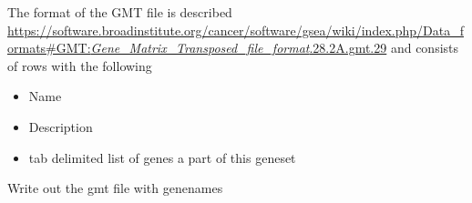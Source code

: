 \documentclass[
]{book}
\newenvironment{Shaded}{\begin{snugshade}}{\end{snugshade}}
\newcommand{\AttributeTok}[1]{\textcolor[rgb]{0.13,0.29,0.53}{#1}}
\newcommand{\ControlFlowTok}[1]{\textcolor[rgb]{0.13,0.29,0.53}{\textbf{#1}}}
\newcommand{\FunctionTok}[1]{\textcolor[rgb]{0.13,0.29,0.53}{\textbf{#1}}}
\newcommand{\NormalTok}[1]{#1}
\newcommand{\OtherTok}[1]{\textcolor[rgb]{0.56,0.35,0.01}{#1}}
\newcommand{\SpecialCharTok}[1]{\textcolor[rgb]{0.81,0.36,0.00}{\textbf{#1}}}
\newcommand{\StringTok}[1]{\textcolor[rgb]{0.31,0.60,0.02}{#1}}
\providecommand{\tightlist}{%
  \setlength{\itemsep}{0pt}\setlength{\parskip}{0pt}}
\begin{document}
\begin{Shaded}
\end{Shaded}

The format of the GMT file is described \href{here}{https://software.broadinstitute.org/cancer/software/gsea/wiki/index.php/Data\_formats\#GMT:\emph{Gene\_Matrix\_Transposed\_file\_format}.28.2A.gmt.29} and consists of rows with the following

\begin{itemize}
\tightlist
\item
  Name
\item
  Description
\item
  tab delimited list of genes a part of this geneset
\end{itemize}

Write out the gmt file with genenames
\end{document}
